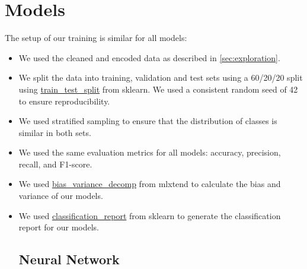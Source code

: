 \section{Models}

The setup of our training is similar for all models:
\begin{itemize}
    \item We used the cleaned and encoded data as described in \ref{sec:exploration}.
    \item We split the data into training, validation and test sets using a 60/20/20 split using \href{https://scikit-learn.org/stable/modules/generated/sklearn.model_selection.train_test_split.html}{train\_test\_split} from sklearn. We used a consistent random seed of 42 to ensure reproducibility.
    \item We used stratified sampling to ensure that the distribution of classes is similar in both sets.
    \item We used the same evaluation metrics for all models: accuracy, precision, recall, and F1-score.
    \item We used \href{https://rasbt.github.io/mlxtend/user_guide/evaluate/bias_variance_decomp/}{bias\_variance\_decomp} from mlxtend to calculate the bias and variance of our models.
    \item We used \href{https://scikit-learn.org/stable/modules/generated/sklearn.metrics.classification_report.html}{classification\_report} from sklearn to generate the classification report for our models.

\subsection{Neural Network}


\end{itemize}
